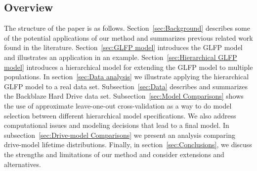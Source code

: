 \documentclass[12pt]{article}
\begin{document}
%

\subsection{Overview}
The structure of the paper is as follows.  Section~\ref{sec:Background} describes some of the potential applications of our method and summarizes previous related work found in the literature. Section~\ref{sec:GLFP model} introduces the GLFP model and illustrates an application in an example. Section~\ref{sec:Hierarchical GLFP model} introduces a hierarchical model for extending the GLFP model to multiple populations. In section~\ref{sec:Data analysis} we illustrate applying the hierarchical GLFP model to a real data set. Subsection~\ref{sec:Data} describes and summarizes the Backblaze Hard Drive data set.  Subsection~\ref{sec:Model Comparisons} shows the use of approximate leave-one-out cross-validation as a way to do model selection between different hierarchical model specifications. We also address computational issues and modeling decisions that lead to a final model.  In subsection~\ref{sec:Drive-model Comparisons} we present an analysis comparing drive-model lifetime distributions.  Finally, in section~\ref{sec:Conclusions}, we discuss the strengths and limitations of our method and consider extensions and alternatives.
\end{document}
